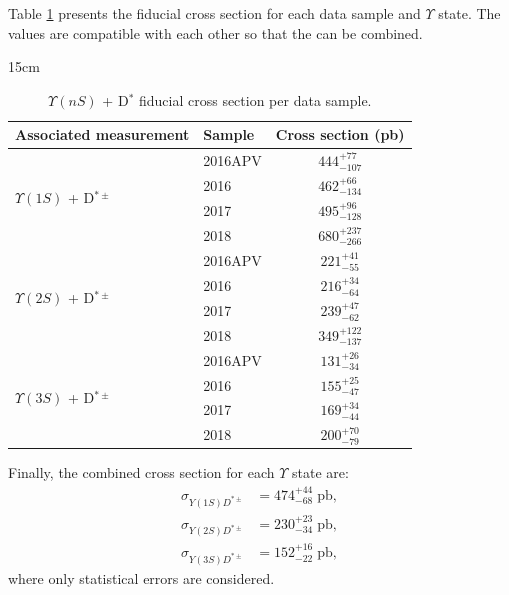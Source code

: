 Table \ref{tab:DPS_xsec} presents the fiducial cross section for each data sample and $\Upsilon$ state. The values are compatible with each other so that the can be combined.

\begin{table}[!htbp]{15cm}
  \caption{$\Upsilon(nS)$ + D$^{*}$ fiducial cross section per data sample.}
  \begin{tabular}{ l | l | c }
    \hline
    Associated measurement & Sample & Cross section (pb) \\ \hline
    \multirow[c]{4}{*}{$\Upsilon(1S)$ + D$^{*\pm}$} 
    & 2016APV & $444^{+77}_{-107}$ \bigstrut\\\cline{2-3} 
    & 2016    & $462^{+66}_{-134}$ \bigstrut\\\cline{2-3} 
    & 2017    & $495^{+96}_{-128}$ \bigstrut\\\cline{2-3} 
    & 2018    & $680^{+237}_{-266}$ \\ \hline
    \multirow[c]{4}{*}{$\Upsilon(2S)$ + D$^{*\pm}$} 
    & 2016APV & $221^{+41}_{-55}$ \bigstrut\\\cline{2-3} 
    & 2016    & $216^{+34}_{-64}$ \bigstrut\\\cline{2-3} 
    & 2017    & $239^{+47}_{-62}$ \bigstrut\\\cline{2-3} 
    & 2018    & $349^{+122}_{-137}$ \\ \hline
    \multirow[c]{4}{*}{$\Upsilon(3S)$ + D$^{*\pm}$} 
    & 2016APV & $131^{+26}_{-34}$ \bigstrut\\\cline{2-3} 
    & 2016    & $155^{+25}_{-47}$ \bigstrut\\\cline{2-3} 
    & 2017    & $169^{+34}_{-44}$ \bigstrut\\\cline{2-3} 
    & 2018    & $200^{+70}_{-79}$ \\ \hline
  \end{tabular}
  \label{tab:DPS_xsec}
\end{table}

Finally, the combined cross section for each $\Upsilon$ state are:
\begin{equation}
\begin{split}
  \sigma_{Y(1S)D^{*\pm}} &= 474^{+44}_{-68} \; \text{pb},\\
  \sigma_{Y(2S)D^{*\pm}} &= 230^{+23}_{-34} \; \text{pb},\\
  \sigma_{Y(3S)D^{*\pm}} &= 152^{+16}_{-22} \; \text{pb},
\end{split} 
\end{equation}
where only statistical errors are considered.

